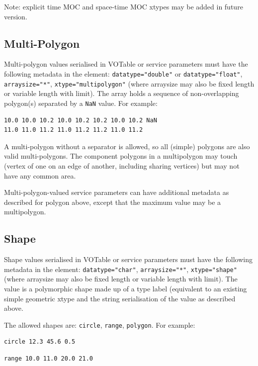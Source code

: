 \documentclass[11pt,letter]{ivoa}
\begin{document}
Note: explicit time MOC and space-time MOC xtypes may be added in future version.

\subsection{Multi-Polygon}
Multi-polygon values serialised in VOTable or service parameters must have the
following metadata in the  element:  \verb|datatype="double"| or \verb|datatype="float"|,
\verb|arraysize="*"|, \verb|xtype="multipolygon"|
(where arraysize may also be fixed length or variable length with limit).
The array holds a sequence of non-overlapping polygon(s) separated by a \verb|NaN| value. For example:

\begin{verbatim}
10.0 10.0 10.2 10.0 10.2 10.2 10.0 10.2 NaN
11.0 11.0 11.2 11.0 11.2 11.2 11.0 11.2
\end{verbatim}

A multi-polygon without a separator is allowed, so all (simple) polygons are also valid multi-polygons. The
component polygons in a multipolygon may touch (vertex of one on an edge of another, including sharing vertices)
but may not have any common area.

Multi-polygon-valued service parameters can have additional metadata as described
for polygon above, except that the maximum value may be a multipolygon.

\subsection{Shape}
Shape values serialised in VOTable or service parameters must have the following metadata in the
 element: \verb|datatype="char"|, \verb|arraysize="*"|, \verb|xtype="shape"|
(where arraysize may also be fixed length or variable length with limit).
The value is a polymorphic shape made up of a type label (equivalent to an existing simple
geometric xtype and the string serialisation of the value as described above.

The allowed shapes are: \verb|circle|, \verb|range|, \verb|polygon|. For example:

\begin{verbatim}
circle 12.3 45.6 0.5
\end{verbatim}

\begin{verbatim}
range 10.0 11.0 20.0 21.0
\end{verbatim}
\end{document}
